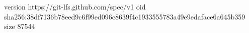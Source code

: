 version https://git-lfs.github.com/spec/v1
oid sha256:38df7136b78eed9c6f99ed096c8639f4c1933555783a49e9edaface6a645b359
size 87544
